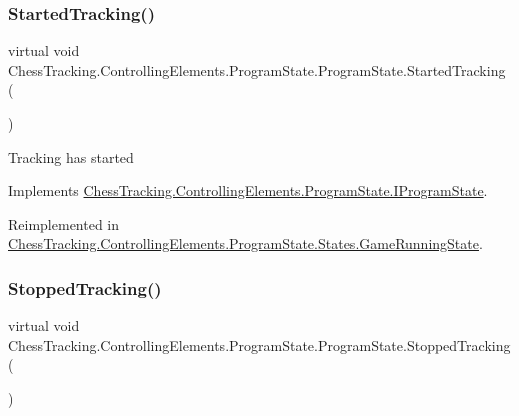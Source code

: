 \mbox{\label{class_chess_tracking_1_1_controlling_elements_1_1_program_state_1_1_program_state_a633786bcd19a9f94d568115db3cdb5d9}} 
\subsubsection{\texorpdfstring{StartedTracking()}{StartedTracking()}}
{\footnotesize\ttfamily virtual void Chess\+Tracking.\+Controlling\+Elements.\+Program\+State.\+Program\+State.\+Started\+Tracking (\begin{DoxyParamCaption}{ }\end{DoxyParamCaption})\hspace{0.3cm}{\ttfamily [virtual]}}



Tracking has started 



Implements \mbox{\hyperlink{interface_chess_tracking_1_1_controlling_elements_1_1_program_state_1_1_i_program_state_a6c68e5ce7c334b28439ae9bdc7462e8d}{Chess\+Tracking.\+Controlling\+Elements.\+Program\+State.\+I\+Program\+State}}.



Reimplemented in \mbox{\hyperlink{class_chess_tracking_1_1_controlling_elements_1_1_program_state_1_1_states_1_1_game_running_state_aa540a4f9c96114762fe08925d7cdc6de}{Chess\+Tracking.\+Controlling\+Elements.\+Program\+State.\+States.\+Game\+Running\+State}}.

\mbox{\label{class_chess_tracking_1_1_controlling_elements_1_1_program_state_1_1_program_state_a0c86a45963ed8eb2b938f5d8f2d956ff}} 
\subsubsection{\texorpdfstring{StoppedTracking()}{StoppedTracking()}}
{\footnotesize\ttfamily virtual void Chess\+Tracking.\+Controlling\+Elements.\+Program\+State.\+Program\+State.\+Stopped\+Tracking (\begin{DoxyParamCaption}{ }\end{DoxyParamCaption})\hspace{0.3cm}{\ttfamily [virtual]}}



